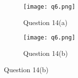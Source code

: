 \begin{enumerate}
\end{enumerate}

\begin{figure}[!htb]
\centering
\begin{subfigure}[b]{\textwidth}
\centering
\texttt{[image: q6.png]}
\caption{Question 14(a)}
\end{subfigure}
\begin{subfigure}[b]{\textwidth}
\centering
\texttt{[image: q6.png]}
\caption{Question 14(b)}
\end{subfigure}
\end{figure}

\newpage